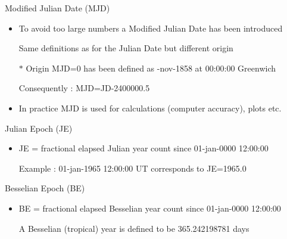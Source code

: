 \Tr
\begin{center}
{\red Modified Julian Date (MJD)}
\end{center}
%
\begin{itemize}
\item To avoid too large numbers a {\blue Modified Julian Date} has been introduced 
\item[] Same definitions as for the Julian Date but different origin
\item[$\ast$] {\blue Origin MJD=0} has been defined as {-nov-1858 at 00:00:00 Greenwich}
\item[] Consequently : {\blue MJD=JD-2400000.5}
\item In practice MJD is used for calculations (computer accuracy), plots etc.
\end{itemize}
%
\begin{center}
{\red Julian Epoch (JE)}
\end{center}
%
\begin{itemize}
\item JE = fractional elapsed Julian year count since 01-jan-0000 12:00:00
\item[] Example : 01-jan-1965 12:00:00 UT corresponds to JE=1965.0
\end{itemize}
%
\begin{center}
{\red Besselian Epoch (BE)}
\end{center}
%
\begin{itemize}
\item BE = fractional elapsed Besselian year count since 01-jan-0000 12:00:00
\item[] A Besselian (tropical) year is defined to be 365.242198781 days
\end{itemize}
